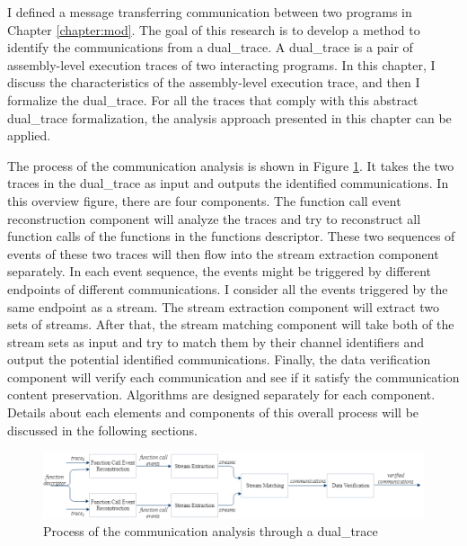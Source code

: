 


\label{chapter:alo}
I defined a message transferring communication between two programs in Chapter \ref{chapter:mod}. The goal of this research is to develop a method to identify the communications from a dual\_trace. A dual\_trace is a pair of assembly-level execution traces of two interacting programs. In this chapter, I discuss the characteristics of the assembly-level execution trace, and then I formalize the dual\_trace. For all the traces that comply with this abstract dual\_trace formalization, the analysis approach presented in this chapter can be applied.


The process of the communication analysis is shown in Figure \ref{overview}. It takes the two traces in the dual\_trace as input and outputs the identified communications. In this overview figure, there are four components. The function call event reconstruction component will analyze the traces and try to reconstruct all function calls of the functions in the functions descriptor. These two sequences of events of these two traces will then flow into the stream extraction component separately. In each event sequence, the events might be triggered by different endpoints of different communications. I consider all the events triggered by the same endpoint as a stream. The stream extraction component will extract two sets of streams. After that, the stream matching component will take both of the stream sets as input and try to match them by their channel identifiers and output the potential identified communications. Finally, the data verification component will verify each communication and see if it satisfy the communication content preservation. Algorithms are designed separately for each component. Details about each elements and components of this overall process will be discussed in the following sections.


\begin{figure}[H]
\centerline{\includegraphics[scale=0.5]{Figures/overview}}
\caption{Process of the communication analysis through a dual\_trace}
\label{overview}
\end{figure}

